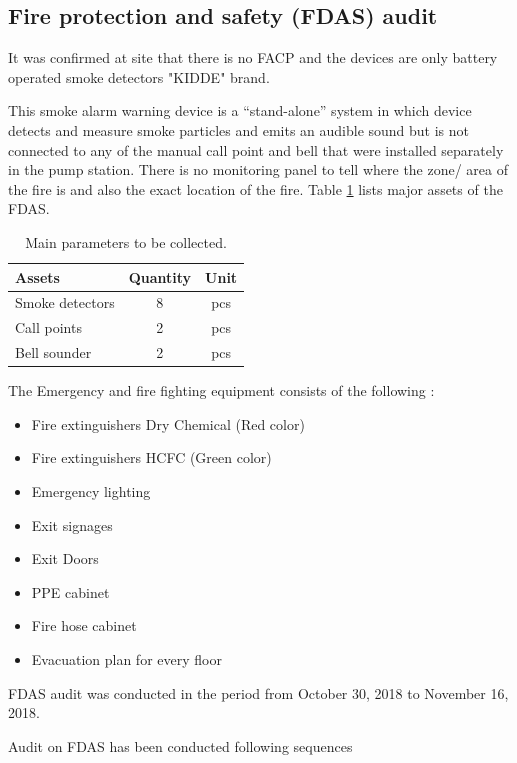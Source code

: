 \subsection{Fire protection and safety (FDAS) audit}
\label{234}
It was confirmed at site that there is no FACP and the devices are only battery operated smoke detectors "KIDDE" brand. 

This smoke alarm warning device is a “stand-alone” system in which device detects and measure smoke particles and emits an audible sound but is not connected to any of the manual call point and bell that were installed separately in the pump station. There is no monitoring panel to tell where the zone/ area of the fire is and also the exact location of the fire. Table \ref{ch02_tbl_fdas01} lists major assets of the FDAS.

\begin{table}[h]
	\caption{Main parameters to be collected.}
	\label{ch02_tbl_fdas01}
	{\footnotesize
	\begin{tabular}{l|l|l}
		\hline
		Assets & Quantity & Unit \\ 
		\hline
		Smoke detectors & \multicolumn{1}{c|}{8} & \multicolumn{1}{c}{pcs} \\ 
		Call points & \multicolumn{1}{c|}{2} & \multicolumn{1}{c}{pcs} \\ 
		Bell sounder & \multicolumn{1}{c|}{2} & \multicolumn{1}{c}{pcs} \\ 
		\hline
	\end{tabular}
	}
\end{table}

The Emergency and fire fighting equipment consists of the following :
\begin{itemize}
\item Fire extinguishers Dry Chemical (Red color)
\item Fire extinguishers HCFC (Green color)
\item Emergency lighting 
\item Exit signages
\item Exit Doors
\item PPE cabinet
\item Fire hose cabinet
\item Evacuation plan for every floor
\end{itemize}

FDAS audit was conducted in the period from October 30, 2018 to November 16, 2018.


Audit on FDAS has been conducted following sequences

